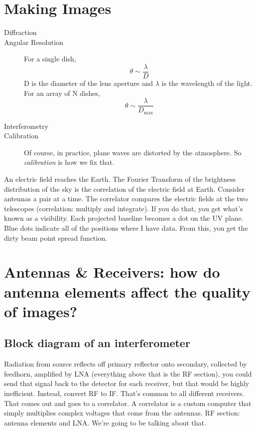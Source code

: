 \documentclass[a4paper]{article}
\begin{document}
\section{Making Images}

\begin{description}

\item[Diffraction]

\item[Angular Resolution]
For a single dish,
$$ \theta \sim \frac{\lambda}{D} $$
D is the diameter of the lens aperture and $\lambda$ is the wavelength of the light. 
For an array of N dishes,
$$ \theta \sim \frac{\lambda}{D_\mathrm{max}} $$

\item[Interferometry]

\item[Calibration]
Of course, in practice, plane waves are distorted by the atmosphere. So \emph{calibration} is how we fix that.

\end{description}

An electric field reaches the Earth. The Fourier Transform of the brightness distribution of the sky is the correlation of the electric field at Earth. Consider antennas a pair at a time. The correlator compares the electric fields at the two telescopes (correlation: multiply and integrate). If you do that, you get what's known as a visibility. Each projected baseline becomes a dot on the UV plane. Blue dots indicate all of the positions where I have data. From this, you get the dirty beam point spread function. 

\section{Antennas \& Receivers: how do antenna elements affect the quality of images?}

\subsection{Block diagram of an interferometer}

Radiation from source reflects off primary reflector onto secondary, collected by feedhorn, amplified by LNA (everything above that is the RF section), you could send that signal back to the detector for each receiver, but that would be highly inefficient. Instead, convert RF to IF. That's common to all different receivers. That comes out and goes to a correlator. A correlator is a custom computer that simply multiplies complex voltages that come from the antennas. RF section: antenna elements and LNA. We're going to be talking about that.
\end{document}
